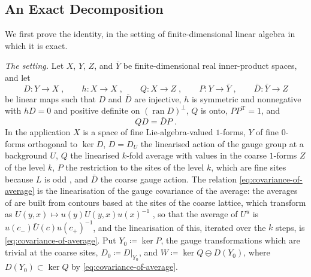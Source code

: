 \documentclass[11pt]{preprint}
\numberwithin{equation}{section}
\theoremstyle{definition}
\theoremstyle{remark}
\theoremstyle{plain}
\begin{document}
\subsection{An Exact Decomposition}\label{sec:exact-decomposition}

We first prove the identity, in the setting of finite-dimensional linear algebra in which it is exact.

\emph{The setting.} Let $X$, $Y$, $Z$, and $\bar Y$ be finite-dimensional real inner-product spaces, and let
\begin{equation}\label{eq:linear-setting}
    D \colon Y \to X\;,
    \qquad
    h \colon X \to X\;,
    \qquad
    Q \colon X \to Z\;,
    \qquad
    P \colon Y \to \bar Y\;,
    \qquad
    \bar D \colon \bar Y \to Z
\end{equation}
be linear maps such that $D$ and $\bar D$ are injective, $h$ is symmetric and nonnegative with $hD = 0$ and positive definite on $(\operatorname{ran}D)^\perp$, $Q$ is onto, $PP^{\mathrm T} = 1$, and
\begin{equation}\label{eq:covariance-of-average}
    QD = \bar DP\;.
\end{equation}
In the application $X$ is a space of fine Lie-algebra-valued $1$-forms, $Y$ of fine $0$-forms orthogonal to $\ker D$, $D = D_U$ the linearised action of the gauge group at a background $U$, $Q$ the linearised $k$-fold average with values in the coarse $1$-forms $Z$ of the level $k$, $P$ the restriction to the sites of the level $k$, which are fine sites because $L$ is odd \cite[p.~251]{BalabanRG1}, and $\bar D$ the coarse gauge action. The relation \eqref{eq:covariance-of-average} is the linearisation of the gauge covariance of the average: the averages of \cite[(0.4), (0.12), pp.~253--254]{BalabanRG1} are built from contours based at the sites of the coarse lattice, which transform as $U(y, x) \mapsto u(y)U(y, x)u(x)^{-1}$ \cite[(0.6)]{BalabanRG1}, so that the average of $U^u$ is $u(c_-)\bar U(c)u(c_+)^{-1}$, and the linearisation of this, iterated over the $k$ steps, is \eqref{eq:covariance-of-average}. Put $Y_0 \coloneqq \ker P$, the gauge transformations which are trivial at the coarse sites, $D_0 \coloneqq D|_{Y_0}$, and $W \coloneqq \ker Q \ominus D(Y_0)$, where $D(Y_0) \subset \ker Q$ by \eqref{eq:covariance-of-average}.
\end{document}

